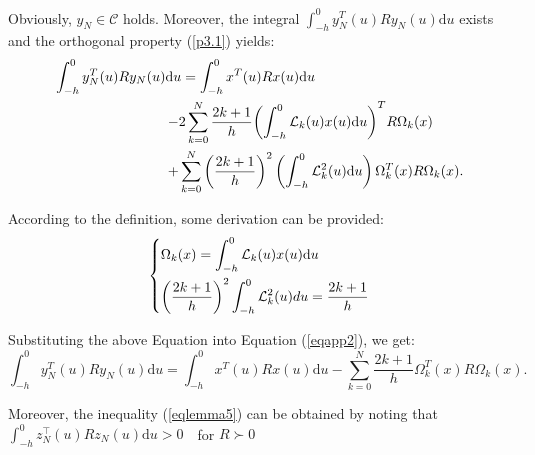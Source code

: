 \documentclass[a4paper]{cas-sc}
\begin{document}
Obviously, ${y_N} \in \mathcal{C}$ holds. Moreover, the integral $\int_{ - h}^0 {y_N^T} (u)R{y_N}(u){\text{d}}u$ exists and the orthogonal property (\ref{p3.1}) yields:
\begin{equation}
  \begin{gathered}
    \int_{ - h}^0 {y_N^T} (u)R{y_N}(u){\text{d}}u = \int_{ - h}^0 {{x^T}} (u)Rx(u){\text{d}}u \hfill \\
    \quad \quad \quad \quad \quad \quad \quad \quad  - 2\sum\limits_{k = 0}^N {\frac{{2k + 1}}{h}} {\left( {\int_{ - h}^0 {{\mathcal{L}_k}} (u)x(u){\text{d}}u} \right)^T}R{\Omega _k}(x) \hfill \\
    \quad \quad \quad \quad \quad \quad \quad \quad  + \sum\limits_{k = 0}^N {{{\left( {\frac{{2k + 1}}{h}} \right)}^2}} \left( {\int_{ - h}^0 {\mathcal{L}_k^2} (u){\text{d}}u} \right)\Omega _k^T(x)R{\Omega _k}(x). \hfill \\
  \end{gathered}
  \label{eqapp2}
\end{equation}

According to the definition, some derivation can be provided:
\begin{equation}
  \left\{ \begin{gathered}
    {\Omega _k}(x) = \int_{ - h}^0 {{\mathcal{L}_k}} (u)x(u){\text{d}}u \hfill \\
    {\left( {\frac{{2k + 1}}{h}} \right)^2}\int_{ - h}^0 {\mathcal{L}_k^2} (u)du = \frac{{2k + 1}}{h} \hfill \\
  \end{gathered}  \right.
  \label{eqapp3}
\end{equation}

Substituting the above Equation into Equation (\ref{eqapp2}), we get:
\begin{equation}
  \int_{ - h}^0 {y_N^T} (u)R{y_N}(u){\text{d}}u = \int_{ - h}^0 {{x^T}} (u)Rx(u){\text{d}}u - \sum\limits_{k = 0}^N {\frac{{2k + 1}}{h}} \Omega _k^T(x)R{\Omega _k}(x).
  \label{eqapp4}
\end{equation}

Moreover, the inequality (\ref{eqlemma5}) can be obtained by noting that $\int_{ - h}^0 {z_N^ \top } (u)R{z_N}(u){\text{d}}u > 0{\text{ }}$ for $R \succ 0$
\end{document}
